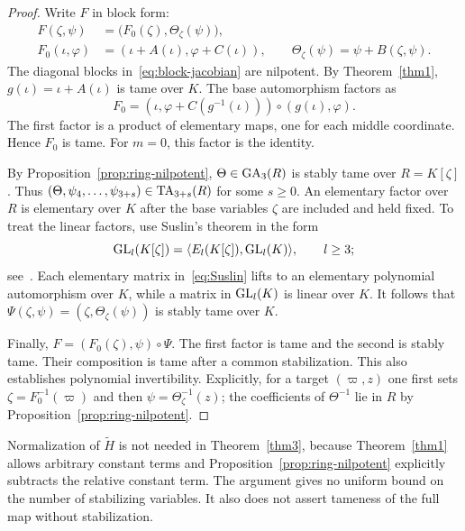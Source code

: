 \begin{proof}
Write $F$ in block form:
\begin{equation}\label{eq:block-F}
 \begin{aligned}
 F(\zeta,\psi)&=\bigl(F_0(\zeta),\Theta_{\zeta}(\psi)\bigr),\\
 F_0(\iota,\varphi)&=(\iota+A(\iota),\varphi+C(\iota)),\qquad \Theta_{\zeta}(\psi)=\psi+B(\zeta,\psi).
 \end{aligned}
\end{equation}
The diagonal blocks in~\eqref{eq:block-jacobian} are nilpotent. By Theorem~\ref{thm1}, $g(\iota)=\iota+A(\iota)$ is tame over $K$. The base automorphism factors as
\[
 F_0=(\iota,\varphi+C(g^{-1}(\iota)))\circ(g(\iota),\varphi).
\]
The first factor is a product of elementary maps, one for each middle coordinate. Hence $F_0$ is tame. For $m=0$, this factor is the identity.

By Proposition~\ref{prop:ring-nilpotent}, $\Theta\in\operatorname{GA}_3(R)$ is stably tame over $R=K[\zeta]$. Thus $(\Theta,\psi_4,\ldots,\psi_{3+s})\in\operatorname{TA}_{3+s}(R)$ for some $s\geq0$. An elementary factor over $R$ is elementary over $K$ after the base variables $\zeta$ are included and held fixed. To treat the linear factors, use Suslin's theorem in the form
\begin{equation}\label{eq:Suslin}
 \operatorname{GL}_l(K[\zeta])=\langle E_l(K[\zeta]),\operatorname{GL}_l(K)\rangle,
 \qquad l\geq3;
\end{equation}
see~\cite[Theorem~3.23]{BEW}. Each elementary matrix in~\eqref{eq:Suslin} lifts to an elementary polynomial automorphism over $K$, while a matrix in $\operatorname{GL}_l(K)$ is linear over $K$. It follows that $\Psi(\zeta,\psi)=(\zeta,\Theta_{\zeta}(\psi))$ is stably tame over $K$.

Finally, $F=(F_0(\zeta),\psi)\circ\Psi$. The first factor is tame and the second is stably tame. Their composition is tame after a common stabilization. This also establishes polynomial invertibility. Explicitly, for a target $(\varpi,z)$ one first sets $\zeta=F_0^{-1}(\varpi)$ and then $\psi=\Theta_{\zeta}^{-1}(z)$; the coefficients of $\Theta^{-1}$ lie in $R$ by Proposition~\ref{prop:ring-nilpotent}.
\end{proof}

\begin{remark}\label{rem:block-scope}
Normalization of $\widetilde H$ is not needed in Theorem~\ref{thm3}, because Theorem~\ref{thm1} allows arbitrary constant terms and Proposition~\ref{prop:ring-nilpotent} explicitly subtracts the relative constant term. The argument gives no uniform bound on the number of stabilizing variables. It also does not assert tameness of the full map without stabilization.
\end{remark}

